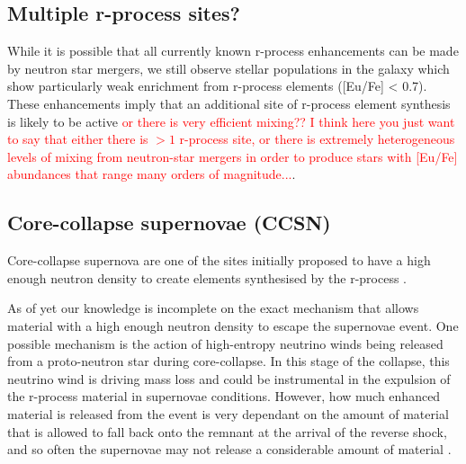 \documentclass[a4paper,fleqn,usenatbib]{mnras}
\newcommand{\todo}[1]{\textcolor{red}{#1}}
\begin{document}
	\subsection{Multiple r-process sites?}
	While it is possible that all currently known r-process enhancements can be made by neutron star mergers, we still observe stellar populations in the galaxy which show particularly weak enrichment from r-process elements ([Eu/Fe] < 0.7). These enhancements imply that an additional site of r-process element synthesis is likely to be active \todo{or there is very efficient mixing?? I think here you just want to say that either there is $>1$ r-process site, or there is extremely heterogeneous levels of mixing from neutron-star mergers in order to produce stars with [Eu/Fe] abundances that range many orders of magnitude...}. 
	
	
	\subsection{Core-collapse supernovae (CCSN)}
	Core-collapse supernova are one of the sites initially proposed to have a high enough neutron density to create elements synthesised by the r-process \citep{Burbidge1957}. 
	
	As of yet our knowledge is incomplete on the exact mechanism that allows material with a high enough neutron density to escape the supernovae event.
	One possible mechanism is the action of high-entropy neutrino winds being released from a proto-neutron star during core-collapse. In this stage of the collapse, this neutrino wind is driving mass loss and could be instrumental in the expulsion of the r-process material in supernovae conditions. However, how much enhanced material is released from the event is very dependant on the amount of material that is allowed to fall back onto the remnant at the arrival of the reverse shock, and so often the supernovae may not release a considerable amount of material \citep{Woosley1992, Burrows1995}. 
	
\end{document}
